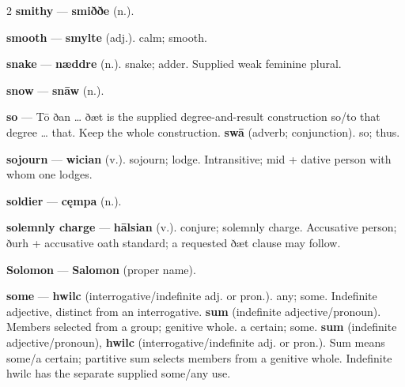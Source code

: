 \begin{multicols}{2}
\textbf{smithy} — \textbf{smiððe} (n.).\par
\textbf{smooth} — \textbf{smylte} (adj.). calm; smooth.\par
\textbf{snake} — \textbf{næddre} (n.). snake; adder. Supplied weak feminine plural.\par
\textbf{snow} — \textbf{snāw} (n.).\par
\textbf{so} — Tō ðan … ðæt is the supplied degree-and-result construction so/to that degree … that. Keep the whole construction. \textbf{swā} (adverb; conjunction). so; thus.\par
\textbf{sojourn} — \textbf{wician} (v.). sojourn; lodge. Intransitive; mid + dative person with whom one lodges.\par
\textbf{soldier} — \textbf{cęmpa} (n.).\par
\textbf{solemnly charge} — \textbf{hālsian} (v.). conjure; solemnly charge. Accusative person; ðurh + accusative oath standard; a requested ðæt clause may follow.\par
\textbf{Solomon} — \textbf{Salomon} (proper name).\par
\textbf{some} — \textbf{hwilc} (interrogative/indefinite adj. or pron.). any; some. Indefinite adjective, distinct from an interrogative. \textbf{sum} (indefinite adjective/pronoun). Members selected from a group; genitive whole. a certain; some. \textbf{sum} (indefinite adjective/pronoun), \textbf{hwilc} (interrogative/indefinite adj. or pron.). Sum means some/a certain; partitive sum selects members from a genitive whole. Indefinite hwilc has the separate supplied some/any use.\par

\end{multicols}
